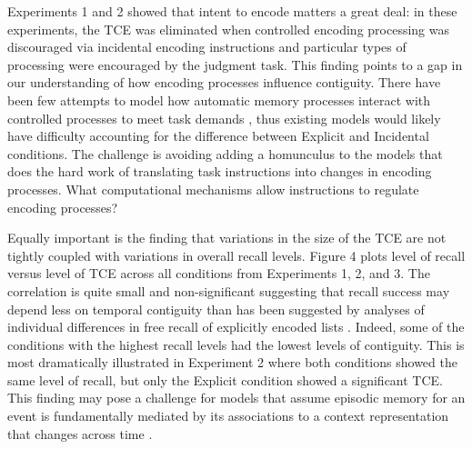 \documentclass[man,natbib,floatsintext]{apa6} %
\begin{document}
Experiments 1 and 2 showed that intent to encode matters a great deal: in these experiments, the TCE was eliminated when controlled encoding processing was discouraged via incidental encoding instructions and particular types of processing were encouraged by the judgment task. This finding points to a gap in our understanding of how encoding processes influence contiguity. There have been few attempts to model how automatic memory processes interact with controlled processes to meet task demands \citep{LehmMalm13,PolyEtal09}, thus existing models would likely have difficulty accounting for the difference between Explicit and Incidental conditions. The challenge is avoiding adding a homunculus to the models that does the hard work of translating task instructions into changes in encoding processes. What computational mechanisms allow instructions to regulate encoding processes?

Equally important is the finding that variations in the size of the TCE are not tightly coupled with variations in overall recall levels. Figure 4 plots level of recall versus level of TCE across all conditions from Experiments 1, 2, and 3. \label{done-12} \color{red} The correlation is quite small and non-significant \color{black} suggesting that recall success may depend less on temporal contiguity than has been suggested by analyses of individual differences in free recall of explicitly encoded lists \citep{SedeEtal10,HealEtal14}. Indeed, some of the conditions with the highest recall levels had the lowest levels of contiguity. This is most dramatically illustrated in Experiment 2 where both conditions showed the same level of recall, but only the Explicit condition showed a significant TCE. This finding may pose a challenge for models that assume episodic memory for an event is fundamentally mediated by its associations to a context representation that changes across time \citep[e.g.,][]{LohnEtal14,HealKaha15}. 
\end{document}
